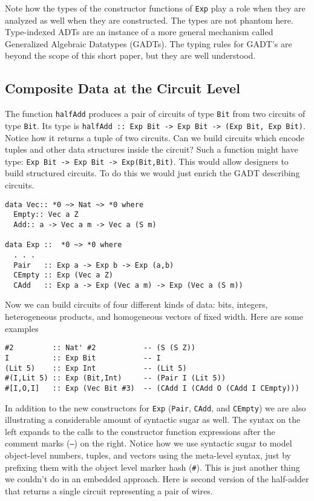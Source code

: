 \documentclass[10pt,twoside]{article}
\begin{document}
Note how the types of the constructor functions of {\tt Exp} play a role when
they are analyzed as well when they are constructed. The types are not
phantom here. Type-indexed ADTs are an instance of a more general mechanism
called Generalized Algebraic Datatypes (GADTs). The typing rules for GADT's
are beyond the scope of this short paper, but they are well
understood\cite{wobbly,Sheard:2004:LF}.

\subsection{Composite Data at the Circuit Level}

The function
{\tt halfAdd} produces a pair of circuits of type {\tt Bit} from two
circuits of type {\tt Bit}. Its type is \verb+halfAdd :: Exp Bit -> Exp Bit -> (Exp Bit, Exp Bit)+.
Notice how it returns a tuple of two circuits. Can we build circuits which
encode tuples and other data structures inside the circuit? Such a function might have
type: \verb+Exp Bit -> Exp Bit -> Exp(Bit,Bit)+. This would allow designers
to build structured circuits. To do this we would just enrich the 
GADT describing circuits.
\begin{verbatim}
data Vec:: *0 ~> Nat ~> *0 where
  Empty:: Vec a Z
  Add:: a -> Vec a m -> Vec a (S m)

data Exp ::  *0 ~> *0 where
  . . .
  Pair   :: Exp a -> Exp b -> Exp (a,b)
  CEmpty :: Exp (Vec a Z)
  CAdd   :: Exp a -> Exp (Vec a m) -> Exp (Vec a (S m))
\end{verbatim}
Now we can build circuits of four
different kinds of data: bits, integers, heterogeneous products, and
homogeneous vectors of fixed width. Here are some examples
\begin{verbatim}
#2         :: Nat' #2           -- (S (S Z))
I          :: Exp Bit           -- I
(Lit 5)    :: Exp Int           -- (Lit 5)
#(I,Lit 5) :: Exp (Bit,Int)     -- (Pair I (Lit 5))
#[I,O,I]   :: Exp (Vec Bit #3)  -- (CAdd I (CAdd O (CAdd I CEmpty)))
\end{verbatim}

In addition to the new constructors for \verb+Exp+ ({\tt Pair}, {\tt CAdd},
and {\tt CEmpty}) we are also illustrating a considerable amount of syntactic
sugar as well. The syntax on the left expands to the calls to the
constructor function expressions after the comment marks ({\tt --}) on the right. Notice
how we use syntactic sugar to model object-level numbers, tuples, and
vectors using the meta-level syntax, just by prefixing them with the object level
marker hash (\verb+#+). This is just another thing we couldn't do in an embedded
approach. Here
is second version of the half-adder that returns a single circuit
representing a pair of wires.
\end{document}
